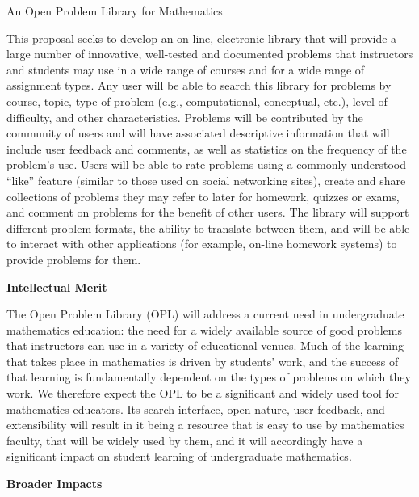 \documentclass[11pt]{article}
\begin{document}
\begin{center}
\Large An Open Problem Library for Mathematics 
\end{center}

\bigskip
\noindent
This proposal seeks to develop an on-line, electronic library that will
provide a large number of innovative, well-tested and documented problems
that instructors and students may use in a wide range of courses and for a
wide range of assignment types.  Any user will be able to search this
library for problems by course, topic, type of problem (e.g.,
computational, conceptual, etc.), level of difficulty, and other
characteristics.  Problems will be contributed by the community of users
and will have associated descriptive information that will include user
feedback and comments, as well as statistics on the frequency of the
problem's use.  Users will be able to rate problems using a commonly
understood ``like'' feature (similar to those used on social networking
sites), create and share collections of problems they may refer to later
for homework, quizzes or exams, and comment on problems for the benefit of
other users.  The library will support different problem formats, the
ability to translate between them, and will be able to interact with other
applications (for example, on-line homework systems) to provide problems
for them.

\bigskip\bigskip
\noindent
{\large \textbf{Intellectual Merit}}

The Open Problem Library (OPL) will address a current need in
undergraduate mathematics education: the need for a widely available
source of good problems that instructors can use in a variety of
educational venues.  Much of the learning that takes place in mathematics
is driven by students' work, and the success of that learning is
fundamentally dependent on the types of problems on which they work.  We
therefore expect the OPL to be a significant and widely used tool for
mathematics educators.  Its search interface, open nature, user feedback,
and extensibility will result in it being a resource that is easy to use
by mathematics faculty, that will be widely used by them, and it will
accordingly have a significant impact on student learning of undergraduate
mathematics.

\bigskip\bigskip
\noindent
{\large \textbf{Broader Impacts}}
\end{document}
